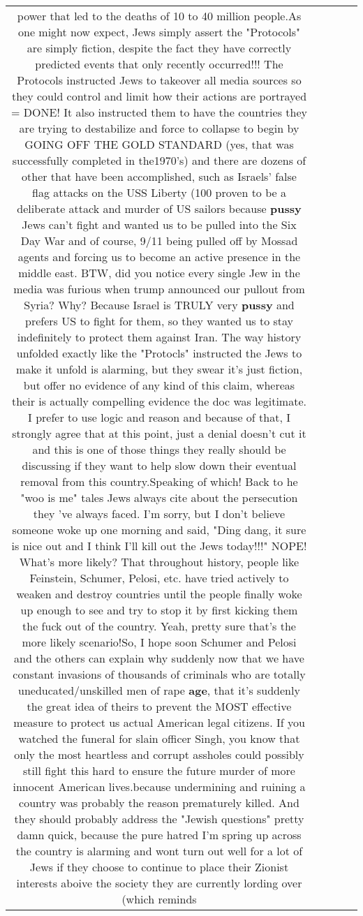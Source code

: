 \documentclass[11pt]{article}
\newlength\mylength
\begin{document}
\begin{center}
\begin{longtable}{|C{.65\mylength}|C{.30\mylength}|C{.12\mylength}|C{.12\mylength}|C{.12\mylength}|}
power that led to the deaths of 10 to 40 million people.As one might now expect, Jews simply assert the "Protocols" are simply fiction, despite the fact they have correctly predicted events that only recently occurred!!!  The Protocols instructed Jews to takeover all media sources so they could control and limit how their actions are portrayed = DONE!  It also instructed them to have the countries they are trying to destabilize and force to collapse to begin by GOING OFF THE GOLD STANDARD (yes, that was successfully completed in the1970's) and there are dozens of other that have been accomplished, such as Israels' false flag attacks on the USS Liberty (100 proven to be a deliberate attack and murder of US sailors because \textbf{pussy} Jews can't fight and wanted us to be pulled into the Six Day War and of course, 9/11 being pulled off by Mossad agents and forcing us to become an active presence in the middle east.  BTW, did you notice every single Jew in the media was furious when trump announced our pullout from Syria?  Why? Because Israel is TRULY very \textbf{pussy} and prefers US to fight for them, so they wanted us to stay indefinitely to protect them against Iran.  The way history unfolded exactly like the "Protocls" instructed the Jews to make it unfold is alarming, but they swear it's just fiction, but offer no evidence of any kind of this claim, whereas their is actually compelling evidence the doc was legitimate.  I prefer to use logic and reason and because of that, I strongly agree that at this point, just a denial doesn't cut it and this is one of those things they really should be discussing if they want to help slow down their eventual removal from this country.Speaking of which! Back to he "woo is me" tales Jews always cite about the persecution they 've always faced.  I'm sorry, but I don't believe someone woke up one morning and said, "Ding dang, it sure is nice out and I think I'll kill out the Jews today!!!"  NOPE!  What's more likely?  That throughout history, people like Feinstein, Schumer, Pelosi, etc. have tried actively to weaken and destroy countries until the people finally woke up enough to see and try to stop it by first kicking them the fuck out of the country.  Yeah, pretty sure that's the more likely scenario!So, I hope soon Schumer and Pelosi and the others can explain why suddenly now that we have constant invasions of thousands of criminals who are totally uneducated/unskilled men of rape \textbf{age}, that it's suddenly the great idea of theirs to prevent the MOST effective measure to protect us actual American legal citizens.  If you watched the funeral for slain officer Singh, you know that only the most heartless and corrupt assholes could possibly still fight this hard to ensure the future murder of more innocent American lives.because undermining and ruining a country was probably the reason  prematurely killed. And they should probably address the "Jewish questions" pretty damn quick, because the pure hatred I'm spring up across the country is alarming and wont turn out well for a lot of Jews if they choose to continue to place their Zionist interests aboive the society they are currently lording over (which reminds 
\end{longtable}
\end{center}
\end{document}
